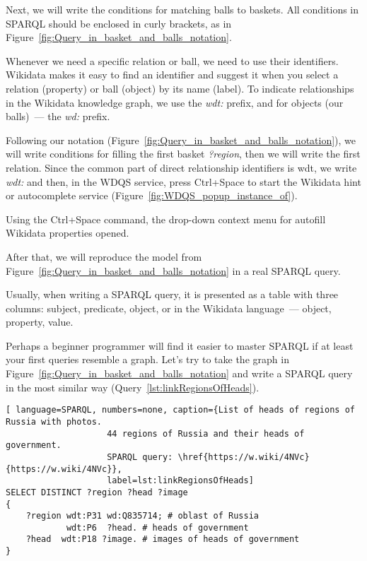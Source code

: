 Next, we will write the conditions for matching balls to baskets. All conditions in SPARQL should be enclosed in curly brackets, as in Figure~\ref{fig:Query_in_basket_and_balls_notation}.

Whenever we need a specific relation or ball, we need to use their identifiers. Wikidata makes it easy to find an identifier and suggest it when you select a relation (property) or ball (object) by its name (label). To indicate relationships in the Wikidata knowledge graph, we use the \textit{wdt:} prefix, and for objects (our balls)~--- the \textit{wd:} prefix. 

Following our notation (Figure~\ref{fig:Query_in_basket_and_balls_notation}), we will write conditions for filling the first basket \textit{?region}, then we will write the first relation. Since the common part of direct relationship identifiers is wdt, we write \textit{wdt:} and then, in the WDQS service, press Ctrl+Space to start the Wikidata hint or autocomplete service (Figure~\ref{fig:WDQS_popup_instance_of}). 

\begin{marginfigure}[-2cm]
	{
		\setlength{\fboxsep}{0pt}%
		\setlength{\fboxrule}{1pt}%
	}
    \caption{Using the Ctrl+Space command, the drop-down context menu for autofill Wikidata properties opened.}
	\label{fig:WDQS_popup_instance_of}
\end{marginfigure}

After that, we will reproduce the model from Figure~\ref{fig:Query_in_basket_and_balls_notation} in a real SPARQL query.

Usually, when writing a SPARQL query, it is presented as a table with three columns: subject, predicate, object, or in the Wikidata language~--- object, property, value.

Perhaps a beginner programmer will find it easier to master SPARQL if at least your first queries resemble a graph. Let's try to take the graph in Figure~\ref{fig:Query_in_basket_and_balls_notation} and write a SPARQL query in the most similar way (Query~\ref{lst:linkRegionsOfHeads}).

\begin{lstlisting}[ language=SPARQL, numbers=none, caption={List of heads of regions of Russia with photos. 
                    44 regions of Russia and their heads of government. 
                    SPARQL query: \href{https://w.wiki/4NVc}{https://w.wiki/4NVc}},
                    label=lst:linkRegionsOfHeads]
SELECT DISTINCT ?region ?head ?image
{
    ?region wdt:P31 wd:Q835714; # oblast of Russia
            wdt:P6  ?head. # heads of government
    ?head  wdt:P18 ?image. # images of heads of government
}
\end{lstlisting}

